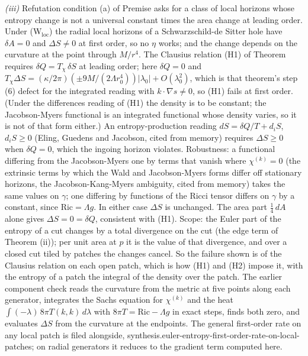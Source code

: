\emph{(iii)} Refutation condition (a) of Premise  asks for a class of local horizons whose entropy change is not a universal constant times the area change at leading order. Under (W$_{\mathrm{loc}}$) the radial local horizons of a Schwarzschild-de Sitter hole have $\delta A = 0$ and $\Delta S \neq 0$ at first order, so no $\eta$ works; and the change depends on the curvature at the point through $M/r^{4}$. The Clausius relation (H1) of Theorem  requires $\delta Q = T_{\chi}\,\delta S$ at leading order; here $\delta Q = 0$ and $T_{\chi}\Delta S = (\kappa/2\pi)(\pm 9M/(2\Lambda r_{0}^{4}))|\lambda_{0}| + O(\lambda_{0}^{2})$, which is that theorem's step (6) defect for the integrated reading with $k\cdot\nabla s \neq 0$, so (H1) fails at first order. (Under the differences reading of (H1) the density is to be constant; the Jacobson-Myers functional is an integrated functional whose density varies, so it is not of that form either.) An entropy-production reading $dS = \delta Q/T + d_{i}S$, $d_{i}S \ge 0$ (Eling, Guedens and Jacobson, cited from memory) requires $\Delta S \ge 0$ when $\delta Q = 0$, which the ingoing horizon violates. Robustness: a functional differing from the Jacobson-Myers one by terms that vanish where $\chi^{(k)} = 0$ (the extrinsic terms by which the Wald and Jacobson-Myers forms differ off stationary horizons, the Jacobson-Kang-Myers ambiguity, cited from memory) takes the same values on $\gamma$; one differing by functions of the Ricci tensor differs on $\gamma$ by a constant, since $\mathrm{Ric} = \Lambda g$. In either case $\Delta S$ is unchanged. The area part $\tfrac14\,dA$ alone gives $\Delta S = 0 = \delta Q$, consistent with (H1). Scope: the Euler part of the entropy of a cut changes by a total divergence on the cut (the edge term of Theorem (ii)); per unit area at $p$ it is the value of that divergence, and over a closed cut tiled by patches the changes cancel. So the failure shown is of the Clausius relation on each open patch, which is how (H1) and (H2) impose it, with the entropy of a patch the integral of the density over the patch. The earlier component check reads the curvature from the metric at five points along each generator, integrates the Sachs equation for $\chi^{(k)}$ and the heat $\int(-\lambda)\,8\pi T(k,k)\,d\lambda$ with $8\pi T = \mathrm{Ric} - \Lambda g$ in exact steps, finds both zero, and evaluates $\Delta S$ from the curvature at the endpoints. The general first-order rate on any local patch is filed alongside, synthesis.euler-entropy-first-order-rate-on-local-patches; on radial generators it reduces to the gradient term computed here.

